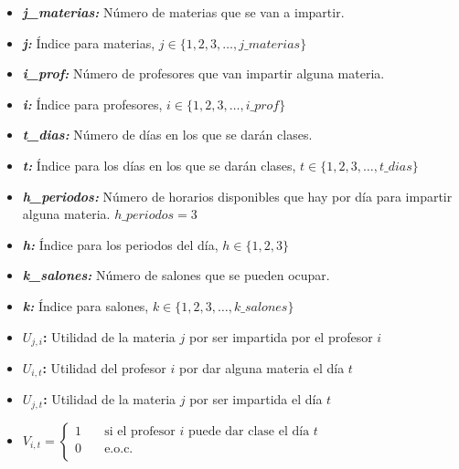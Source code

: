 \documentclass[12pt,spanish]{report}
\begin{document}
\begin{itemize}
\item[ ] \textbf{\textit{j\_materias: }} Número de materias que se van a impartir.

\item[ ] \textbf{\textit{j: }} Índice para materias, $j \in \{ 1, 2, 3, \ldots, j\_materias \}$

\item[ ] \textbf{\textit{i\_prof: }} Número de profesores que van impartir alguna materia.

\item[ ] \textbf{\textit{i: }} Índice para profesores, $i \in \{ 1, 2, 3, \ldots, i\_prof \}$

\item[ ] \textbf{\textit{t\_dias: }} Número de días en los que se darán clases.

\item[ ] \textbf{\textit{t: }} Índice para los días en los que se darán clases, $t \in \{ 1, 2, 3, \ldots, t\_dias \}$

\item[ ] \textbf{\textit{h\_periodos: }} Número de horarios disponibles que hay por día para impartir alguna materia. $h\_periodos = 3$

\item[ ] \textbf{\textit{h: }} Índice para los periodos del día, $h \in \{ 1, 2, 3 \}$

\item[ ] \textbf{\textit{k\_salones: }} Número de salones que se pueden ocupar.

\item[ ] \textbf{\textit{k: }} Índice para salones, $k \in \{ 1, 2, 3, \ldots, k\_salones \}$

\item[ ] \textbf{$U_{j,i}$: } Utilidad de la materia $j$ por ser impartida por el profesor $i$

\item[ ] \textbf{$U_{i,t}$: } Utilidad del profesor $i$ por dar alguna materia el día $t$

\item[ ] \textbf{$U_{j,t}$: } Utilidad de la materia $j$ por ser impartida el día $t$

\item[ ] $ V_{i,t} =
  \begin{cases}
    1  & \quad \text{si el profesor } i \text{ puede dar clase el día } t \\
    0  & \quad \text{e.o.c. } \\
  \end{cases}
$


\end{itemize}
\end{document}

